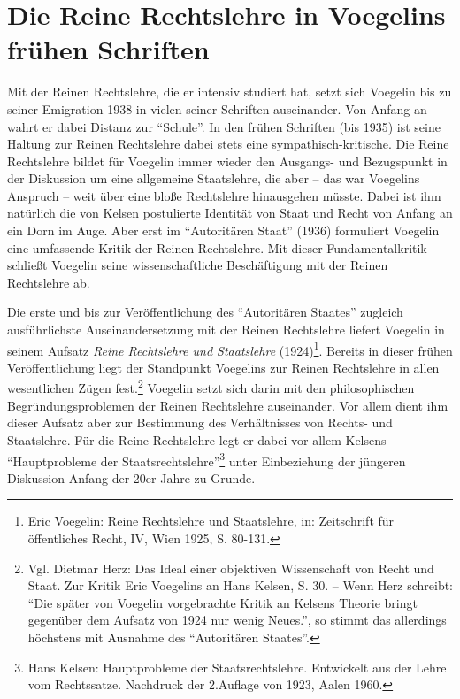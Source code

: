 \documentclass[12pt,a4paper,ngerman]{article}
\begin{document}
\section{Die Reine Rechtslehre in Voegelins frühen Schriften}

Mit der Reinen Rechtslehre, die er intensiv studiert hat, setzt sich
Voegelin bis zu seiner Emigration 1938 in vielen seiner Schriften
auseinander. Von Anfang an wahrt er dabei Distanz zur
"`Schule"'. In den frühen Schriften (bis 1935) ist seine Haltung zur
Reinen Rechtslehre dabei stets eine sympathisch-kritische. Die Reine
Rechtslehre bildet für Voegelin immer wieder den Ausgangs- und
Bezugspunkt in der Diskussion um eine allgemeine Staatslehre, die aber
-- das war Voegelins Anspruch -- weit über eine bloße Rechtslehre
hinausgehen müsste. Dabei ist ihm natürlich die von Kelsen postulierte
Identität von Staat und Recht von Anfang an ein Dorn im Auge. Aber
erst im "`Autoritären Staat"' (1936) formuliert Voegelin eine
umfassende Kritik der Reinen Rechtslehre. Mit dieser Fundamentalkritik
schließt Voegelin seine wissenschaftliche Beschäftigung mit der
Reinen Rechtslehre ab.

Die erste und bis zur Veröffentlichung des "`Autoritären Staates"' zugleich
ausführlichste Auseinandersetzung mit der Reinen Rechtslehre liefert Voegelin
in seinem Aufsatz {\em Reine Rechtslehre und Staatslehre} (1924)\footnote{Eric
  Voegelin: Reine Rechtslehre und Staatslehre, in: Zeitschrift für
  öffentliches Recht, IV, Wien 1925, S. 80-131.}. Bereits in dieser frühen
Veröffentlichung liegt der Standpunkt Voegelins zur Reinen Rechtslehre in
allen wesentlichen Zügen fest.\footnote{Vgl. Dietmar Herz: Das Ideal einer
  objektiven Wissenschaft von Recht und Staat. Zur Kritik Eric Voegelins an
  Hans Kelsen, S. 30. -- Wenn Herz schreibt: "`Die später von Voegelin
  vorgebrachte Kritik an Kelsens Theorie bringt gegenüber dem Aufsatz von 1924
  nur wenig Neues."', so stimmt das allerdings höchstens mit Ausnahme des
  "`Autoritären Staates"'.}  Voegelin setzt sich darin mit den philosophischen
Begründungsproblemen der Reinen Rechtslehre auseinander. Vor allem dient ihm
dieser Aufsatz aber zur Bestimmung des Verhältnisses von Rechts- und
Staatslehre. Für die Reine Rechtslehre legt er dabei vor allem Kelsens
"`Hauptprobleme der Staatsrechtslehre"'\footnote{Hans Kelsen: Hauptprobleme
  der Staatsrechtslehre.  Entwickelt aus der Lehre vom Rechtssatze.  Nachdruck
  der 2.Auflage von 1923, Aalen 1960.} unter Einbeziehung der jüngeren
Diskussion Anfang der 20er Jahre zu Grunde.
\end{document}
